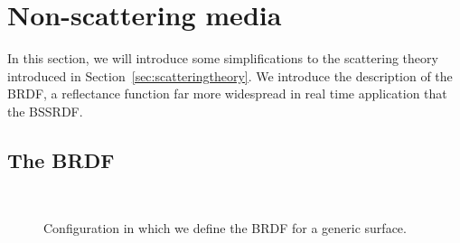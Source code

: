 \section{Non-scattering media}
\label{sec:brdftheory}
In this section, we will introduce some simplifications to the scattering theory introduced in Section~\ref{sec:scatteringtheory}. We introduce the description of the BRDF, a reflectance function far more widespread in real time application that the BSSRDF.   

\subsection{The BRDF}
\begin{figure}
\centering
   \def\svgwidth{0.8\textwidth}
    \\
\caption{Configuration in which we define the BRDF for a generic surface.} %
\label{fig:brdf_configuration}
\end{figure}

